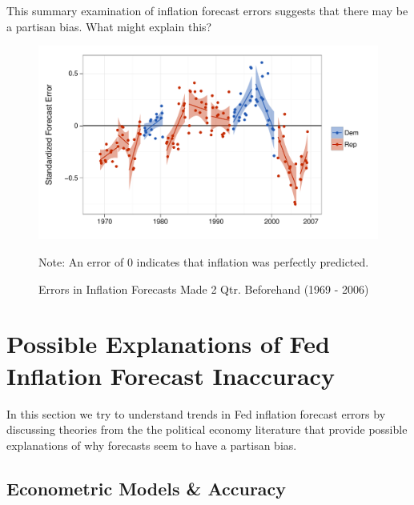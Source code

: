 \documentclass[a4paper]{article}
\begin{document}
This summary examination of inflation forecast errors suggests that there may be a partisan bias. What might explain this?

\begin{figure}[t]
    \caption{Errors in Inflation Forecasts Made 2 Qtr. Beforehand (1969 - 2006)}
    \label{errors_over_time}
    \begin{center}
    
\begin{knitrout}
\color{fgcolor}\includegraphics[width=0.8\linewidth]{figure/PartisanError} 
\end{knitrout}

    
    \end{center}
    \begin{singlespace}
        {\scriptsize{Note: An error of 0 indicates that inflation was perfectly predicted.}}
    \end{singlespace}
\end{figure}


\section{Possible Explanations of Fed Inflation Forecast Inaccuracy}

In this section we try to understand trends in Fed inflation forecast errors by discussing theories from the the political economy literature that provide possible explanations of why forecasts seem to have a partisan bias. 

\subsection{Econometric Models \& Accuracy}
\end{document}
